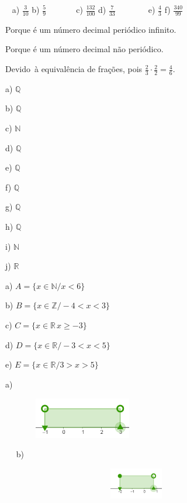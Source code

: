 \begin{respostas}{5}
	\ansitem{} ~ a)  \( \frac{3}{10} \) \quad  b)  \( \frac{5}{9} \) ~~~~~~  c)  \( \frac{132}{100} \) \quad d)  \( \frac{7}{33} \) ~~~~~ ~ e)  \( \frac{4}{3} \) \quad \quad f)  \( \frac{340}{99} \) ~~ 

	\ansitem{}Porque é um número decimal periódico infinito.

	\ansitem{}Porque é um número decimal não periódico.

	\ansitem{} Devido~à equivalência de frações, pois   \( \frac{2}{3} \cdot \frac{2}{2}=\frac{4}{6} \).
	
	\ansitem{}
\begin{multicols}{10}
	
	a) \( \mathbb{Q} \)
	
	b) \( \mathbb{Q} \)
	
	c) \( \mathbb{N} \)
	
	d) \( \mathbb{Q} \)
	
	e) \( \mathbb{Q} \)
	
	f) \( \mathbb{Q} \)

	g) \( \mathbb{Q} \)
	
	h) \( \mathbb{Q} \)
	
	i) \( \mathbb{N} \)
	
	j) $\mathbb{R}$
\end{multicols}
	\ansitem{}
	a) \( A =  \{ x \in \mathbb{N}/ x < 6 \}  \) 

	b)  \( B =  \{ x \in \mathbb{Z}/ -4 < x < 3 \}  \) 

	c)  \( C =  \{ x \in \mathbb{R}\frac{}{}x \geq -3 \}  \) 

	d)  \( D =  \{ x \in \mathbb{R} / -3 < x < 5 \}  \) 

	e)  \( E =  \{ x \in \mathbb{R} / 3 > x> 5 \}  \) 

	\ansitem{}
a)

\begin{figure}[H]
	\begin{Center}
		\includegraphics[width=1.92in,height=0.70in]{capitulos/conjuntos_numericos/media/image17.png}
	\end{Center}
\end{figure}

~~
 b)

\begin{figure}[H]
	\begin{Center}
		\includegraphics[width=3.83in,height=0.53in]{capitulos/conjuntos_numericos/media/image18.png}
	\end{Center}
\end{figure}


\end{respostas}
